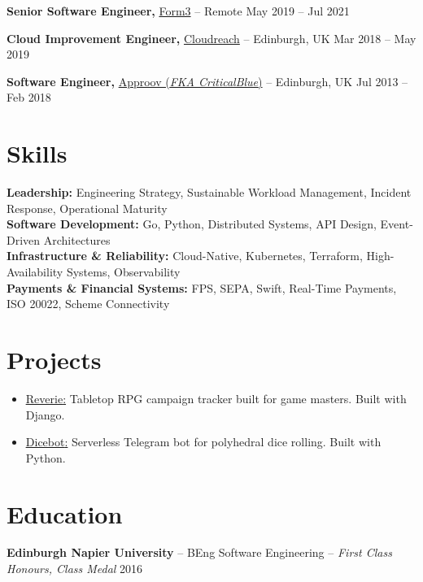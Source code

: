 \documentclass[11pt]{article}       %
\begin{document}
\textbf{Senior Software Engineer,} \href{https://form3.tech/}{Form3} -- Remote \hfill May 2019 -- Jul 2021 \\
\vspace{6.5pt}

\textbf{Cloud Improvement Engineer,} \href{https://eviden.com/about-us/legacy-brands/cloudreach/}{Cloudreach} -- Edinburgh, UK \hfill Mar 2018 -- May 2019 \\
\vspace{6.5pt}

\textbf{Software Engineer,} \href{https://approov.io/}{Approov (\textit{FKA CriticalBlue})} -- Edinburgh, UK \hfill Jul 2013 -- Feb 2018 \\ 
\vspace{-9pt}


\section*{Skills}
\textbf{Leadership:} Engineering Strategy, Sustainable Workload Management, Incident Response, Operational Maturity \\
\textbf{Software Development:} Go, Python, Distributed Systems, API Design, Event-Driven Architectures \\
\textbf{Infrastructure \& Reliability:} Cloud-Native, Kubernetes, Terraform, High-Availability Systems, Observability \\
\textbf{Payments \& Financial Systems:} FPS, SEPA, Swift, Real-Time Payments, ISO 20022, Scheme Connectivity


\vspace{-6.5pt}

\section*{Projects}
\begin{itemize}
  \item \underline{\href{https://github.com/oneirism/reverie}{Reverie}:} Tabletop RPG campaign tracker built for game masters. Built with Django.
  \item \underline{\href{https://github.com/oneirism/dicebot}{Dicebot}:} Serverless Telegram bot for polyhedral dice rolling. Built with Python.
\end{itemize}

\vspace{-18.5pt}

\section*{Education}
\textbf{Edinburgh Napier University} -- BEng Software Engineering -- \textit{First Class Honours, Class Medal} \hfill 2016 \\

\vspace{-6.5pt}

\printbibliography[title=Citations]
\end{document}
